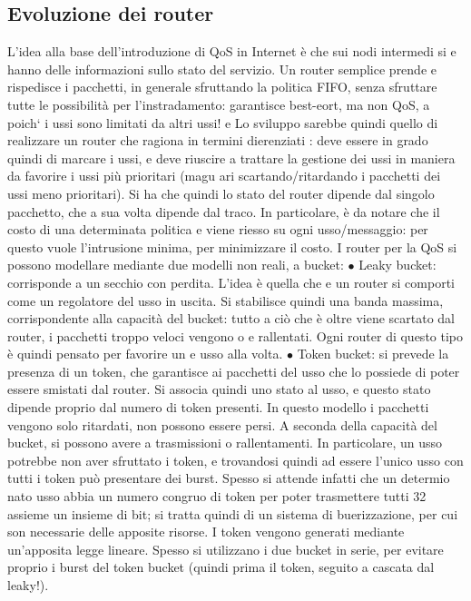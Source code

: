 \documentclass[a4paper,12pt]{article}
\begin{document}
\subsection{Evoluzione dei router}
L'idea alla base dell'introduzione di QoS in Internet è che sui nodi intermedi si
e
hanno delle informazioni sullo stato del servizio. Un router semplice prende e
rispedisce i pacchetti, in generale sfruttando la politica FIFO, senza sfruttare
tutte le possibilità per l'instradamento: garantisce best-eort, ma non QoS,
a
poich` i ussi sono limitati da altri ussi!
e
Lo sviluppo sarebbe quindi quello di realizzare un router che ragiona in termini dierenziati : deve essere in grado
quindi di marcare i ussi, e deve riuscire
a trattare la gestione dei ussi in maniera da favorire i ussi più prioritari (magu
ari scartando/ritardando i pacchetti dei ussi meno prioritari). Si ha che quindi
lo stato del router dipende dal singolo pacchetto, che a sua volta dipende dal
traco. In particolare, è da notare che il costo di una determinata politica
e
viene riesso su ogni usso/messaggio: per questo vuole l'intrusione minima,
per minimizzare il costo.
I router per la QoS si possono modellare mediante due modelli non reali, a
bucket:
$\bullet$ Leaky bucket: corrisponde a un secchio con perdita. L'idea è quella che
e
un router si comporti come un regolatore del usso in uscita. Si stabilisce
quindi una banda massima, corrispondente alla capacità del bucket: tutto
a
ciò che è oltre viene scartato dal router, i pacchetti troppo veloci vengono
o
e
rallentati. Ogni router di questo tipo è quindi pensato per favorire un
e
usso alla volta.
$\bullet$ Token bucket: si prevede la presenza di un token, che garantisce ai pacchetti del usso che lo possiede di
poter essere smistati dal router. Si associa
quindi uno stato al usso, e questo stato dipende proprio dal numero di
token presenti. In questo modello i pacchetti vengono solo ritardati, non
possono essere persi. A seconda della capacità del bucket, si possono avere
a
trasmissioni o rallentamenti. In particolare, un usso potrebbe non aver
sfruttato i token, e trovandosi quindi ad essere l'unico usso con tutti i
token può presentare dei burst. Spesso si attende infatti che un determio
nato usso abbia un numero congruo di token per poter trasmettere tutti
32
assieme un insieme di bit; si tratta quindi di un sistema di buerizzazione,
per cui son necessarie delle apposite risorse. I token vengono generati
mediante un'apposita legge lineare.
Spesso si utilizzano i due bucket in serie, per evitare proprio i burst del token
bucket (quindi prima il token, seguito a cascata dal leaky!).
\end{document}
